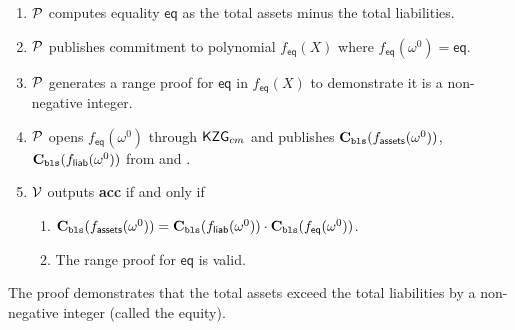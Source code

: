 

\begin{Protocol*}[t!]
\begin{mdframed}
\footnotesize


\begin{enumerate}
    \item $\mathcal{P}$ computes equality $\mathsf{eq}$ as the total assets minus the total liabilities. 
    \item $\mathcal{P}$ publishes commitment to polynomial $f_\mathsf{eq}(X)$ where $f_\mathsf{eq}(\omega^0)=\mathsf{eq}$.
    \item $\mathcal{P}$ generates a range proof for $\mathsf{eq}$ in $f_\mathsf{eq}(X)$ to demonstrate it is a non-negative integer.
    \item $\mathcal{P}$ opens $f_\mathsf{eq}(\omega^0)$ through $\mathsf{KZG}_{cm}$ and publishes $\textbf{C}_\texttt{bls}(f_\mathsf{assets}(\omega^0))$, $\textbf{C}_\texttt{bls}(f_\mathsf{liab}(\omega^0))$ from \poa and \pol.
    \item $\mathcal{V}$ outputs \textbf{acc} if and only if
    \begin{enumerate}
        \item $\textbf{C}_\texttt{bls}(f_\mathsf{assets}(\omega^0))=\textbf{C}_\texttt{bls}(f_\mathsf{liab}(\omega^0))\cdot\textbf{C}_\texttt{bls}(f_\mathsf{eq}(\omega^0))$.
        \item The range proof for $\mathsf{eq}$ is valid.
    \end{enumerate}
\end{enumerate}


\normalsize	
\end{mdframed}
\caption{The \pos proof demonstrates that the total assets exceed the total liabilities by a non-negative integer (called the equity). \label{alg:pos}}
\end{Protocol*}
